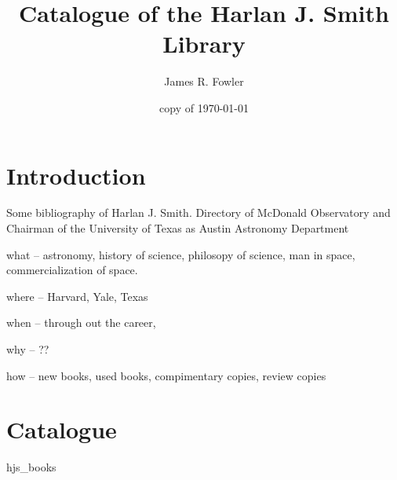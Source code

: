 \documentclass{article}
\begin{document}
\title{Catalogue of the Harlan J. Smith Library}
\author{James R. Fowler}
\date{copy of \today}
\maketitle

\section{Introduction}

Some bibliography of Harlan J. Smith. Directory of McDonald Observatory
and Chairman of the University of Texas as Austin Astronomy Department

what -- astronomy, history of science, philosopy of science, man in space,
commercialization of space.

where --  Harvard, Yale, Texas

when -- through out the career,

why -- ??

how -- new books, used books, compimentary copies, review copies

\section{Catalogue}
{hjs_books}

%
%
\end{document}
